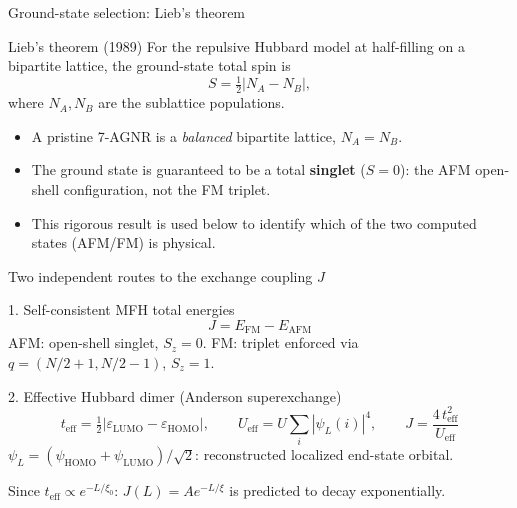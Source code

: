\documentclass[aspectratio=169,11pt]{beamer}
\begin{document}
\begin{frame}{Ground-state selection: Lieb's theorem}
  \begin{alertblock}{Lieb's theorem (1989)}
    For the repulsive Hubbard model at half-filling on a bipartite lattice, the ground-state total spin is
    \[
      S = \tfrac12 |N_A - N_B|,
    \]
    where $N_A,N_B$ are the sublattice populations.
  \end{alertblock}
  \begin{itemize}
    \item A pristine 7-AGNR is a \emph{balanced} bipartite lattice, $N_A=N_B$.
    \item[$\Rightarrow$] The ground state is guaranteed to be a total \textbf{singlet} ($S=0$): the AFM open-shell configuration, not the FM triplet.
    \item This rigorous result is used below to identify which of the two computed states (AFM/FM) is physical.
  \end{itemize}
\end{frame}

\begin{frame}{Two independent routes to the exchange coupling $J$}
  \begin{block}{1. Self-consistent MFH total energies}
    \[
      J = E_{\mathrm{FM}} - E_{\mathrm{AFM}}
    \]
    AFM: open-shell singlet, $S_z=0$. FM: triplet enforced via $q=(N/2{+}1, N/2{-}1)$, $S_z=1$.
  \end{block}
  \begin{block}{2. Effective Hubbard dimer (Anderson superexchange)}
    \[
      t_{\mathrm{eff}} = \tfrac{1}{2}|\varepsilon_{\mathrm{LUMO}}-\varepsilon_{\mathrm{HOMO}}|, \qquad
      U_{\mathrm{eff}} = U\sum_i |\psi_L(i)|^4, \qquad
      J = \frac{4\,t_{\mathrm{eff}}^2}{U_{\mathrm{eff}}}
    \]
    $\psi_L = (\psi_{\mathrm{HOMO}}+\psi_{\mathrm{LUMO}})/\sqrt{2}$: reconstructed localized end-state orbital.
  \end{block}
  Since $t_{\mathrm{eff}}\propto e^{-L/\xi_0}$: $J(L)=Ae^{-L/\xi}$ is predicted to decay exponentially.
\end{frame}
\end{document}
